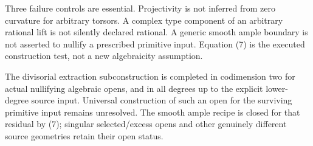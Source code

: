 \documentclass[11pt]{article}
\begin{document}
Three failure controls are essential. Projectivity is not inferred from
zero curvature for arbitrary torsors. A complex type component of an
arbitrary rational lift is not silently declared rational. A generic
smooth ample boundary is not asserted to nullify a prescribed primitive
input. Equation (7) is the executed construction test, not a new
algebraicity assumption.

The divisorial extraction subconstruction is completed in codimension two
for actual nullifying algebraic opens, and in all degrees up to the
explicit lower-degree source input. Universal construction of such an open
for the surviving primitive input remains unresolved. The smooth ample
recipe is closed for that residual by (7); singular selected/excess opens
and other genuinely different source geometries retain their open status.
\end{document}
